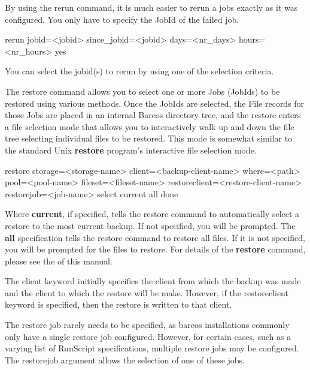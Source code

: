 \begin{description}
{   By using the rerun command, it is much easier to rerun a jobs exactly
   as it was configured. You only have to specify the JobId of the failed job.

rerun jobid={\textless}jobid{\textgreater} since_jobid={\textless}jobid{\textgreater}
  days={\textless}nr_days{\textgreater} hours={\textless}nr_hours{\textgreater} yes

   You can select the jobid(s) to rerun by using one of the selection criteria.

\item [restore]
   \label{restore_command}
   The restore command allows you to select one or more Jobs (JobIds) to be
   restored using various methods.  Once the JobIds are selected, the File
   records for those Jobs are placed in an internal Bareos directory tree,
   and the restore enters a file selection mode that allows you to
   interactively walk up and down the file tree selecting individual files
   to be restored.  This mode is somewhat similar to the standard Unix {\bf
   restore} program's interactive file selection mode.

restore storage={\textless}storage-name{\textgreater} client={\textless}backup-client-name{\textgreater}
  where={\textless}path{\textgreater} pool={\textless}pool-name{\textgreater} fileset={\textless}fileset-name{\textgreater}
  restoreclient={\textless}restore-client-name{\textgreater}
  restorejob={\textless}job-name{\textgreater}
  select current all done

   Where {\bf current}, if specified, tells the restore command to
   automatically select a restore to the most current backup.  If not
   specified, you will be prompted.  The {\bf all} specification tells the
   restore command to restore all files.  If it is not specified, you will
   be prompted for the files to restore.  For details of the {\bf restore}
   command, please see the  of this
   manual.

   The client keyword initially specifies the client from which the backup
   was made and the client to which the restore will be make.  However,
   if the restoreclient keyword is specified, then the restore is written
   to that client.

   The restore job rarely needs to be specified, as bareos installations
   commonly only have a single restore job configured. However, for certain
   cases, such as a varying list of RunScript specifications, multiple
   restore jobs may be configured. The restorejob argument allows the
   selection of one of these jobs.

}
\end{description}
